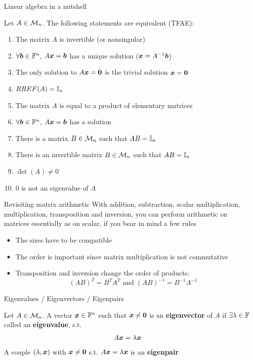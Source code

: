 \documentclass[aspectratio=169]{beamer}\usepackage[]{graphicx}\usepackage[]{xcolor}
\begin{document}
\begin{frame}{Linear algebra in a nutshell}
\begin{importanttheorem}\label{th:app_linalg_nutshell}
Let $A\in\mathcal{M}_n$. The following statements are equivalent (TFAE):
\begin{enumerate}
	\item The matrix $A$ is invertible (or nonsingular)
	\item $\forall\bm{b}\in\mathbb{F}^n$, $A\bm{x} = \bm{b}$ has a unique solution ($\bm{x}=A^{-1}\bm{b}$)
	\item The only solution to $A\bx = \b0$ is the trivial solution $\bx = \b0$
	\item $RREF(A)=\mathbb{I}_n$
	\item The matrix $A$ is equal to a product of elementary matrices
	\item $\forall\bm{b}\in\mathbb{F}^n$, $A\bm{x} = \bm{b}$ has a solution
	\item There is a matrix $B\in\mathcal{M}_n$ such that $AB = \mathbb{I}_n$
	\item There is an invertible matrix $B\in\mathcal{M}_n$ such that $AB = \mathbb{I}_n$
	\item $\det(A)\neq 0$
	\item $0$ is not an eigenvalue of $A$
\end{enumerate}
\end{importanttheorem}
\end{frame}

\begin{frame}{Revisiting matrix arithmetic}
With addition, subtraction, scalar multiplication, multiplication, transposition and inversion, you can perform arithmetic on matrices essentially as on scalar, if you bear in mind a few rules
\begin{itemize}
\item The sizes have to be compatible
\item The order is important since matrix multiplication is not commutative
\item Transposition and inversion change the order of products:
\[
(AB)^T=B^TA^T\textrm{ and }(AB)^{-1}=B^{-1}A^{-1}
\]
\end{itemize}
\end{frame}



\begin{frame}{Eigenvalues / Eigenvectors / Eigenpairs}
\begin{importantdefinition}
Let $A\in\mathcal{M}_n$. A vector $\bm{x}\in\mathbb{F}^n$ such that $\bx\neq\b0$ is an \textbf{eigenvector} of $A$ if $\exists\lambda\in\mathbb{F}$ called an \textbf{eigenvalue}, s.t.
\[
A\bm{x}=\lambda \bm{x}
\]
A couple $(\lambda,\bm{x})$ with $\bx\neq\b0$ s.t. $A\bm{x}=\lambda\bm{x}$ is an \textbf{eigenpair}
\end{importantdefinition}
\end{frame}
\end{document}
